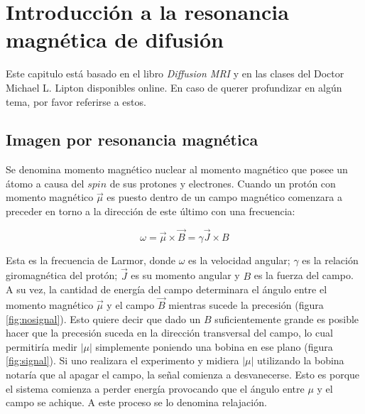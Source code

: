 \chapter{Introducci\'on a la resonancia magn\'etica de difusi\'on}
\label{ch:bkgrnd}

Este capitulo est\'a basado en el libro \textit{Diffusion MRI} 
\cite{Basser2009} y en las clases del Doctor Michael L. Lipton 
\cite{Lipton2014} disponibles online. En caso de querer profundizar en 
alg\'un tema, por favor referirse a estos. 

\section{Imagen por resonancia magnética}
Se denomina momento magn\'etico nuclear al momento magn\'etico que posee
un \'atomo a causa del $spin$ de sus protones y electrones. Cuando un 
prot\'on con momento magn\'etico $\vec{\mu}$ es puesto dentro de un campo
magn\'etico comenzara a preceder en torno a la direcci\'on de este
\'ultimo con una frecuencia: 

$$ \omega = \vec{\mu} \times \vec{B} = \gamma \vec{J} \times B $$

Esta es la frecuencia de Larmor, donde $\omega$ es la velocidad angular;
$\gamma$ es la relaci\'on giromagn\'etica del prot\'on; $\vec{J}$ es su
momento angular y $B$ es la fuerza del campo. A su vez, la cantidad de
energ\'ia del campo determinara el \'angulo entre el momento magn\'etico
$\vec{\mu}$ y el campo $\vec{B}$ mientras sucede la precesi\'on (figura
\ref{fig:nosignal}). Esto quiere decir que dado un $B$ suficientemente
grande es posible hacer que la precesi\'on suceda en la direcci\'on
transversal del campo, lo cual permitir\'ia medir $|\mu|$ simplemente
poniendo una bobina en ese plano (figura \ref{fig:signal}). Si uno
realizara el experimento y midiera $|\mu|$ utilizando la bobina notar\'ia
que al apagar el campo, la se\~nal comienza a desvanecerse. Esto es porque
el sistema comienza a perder energ\'ia provocando que el \'angulo entre 
$\mu$ y el campo se achique. A este proceso se lo denomina relajaci\'on. \\

